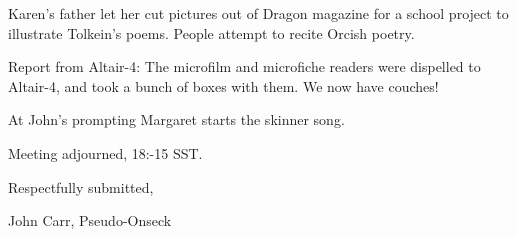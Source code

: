 \documentclass[10pt]{article}
\newcommand{\bing}{{\bf BING!} }
\newcommand{\goto}[1]{\bing \vskip 12pt \section*{{\em{#1}}}}
\begin{document}
Karen's father let her cut pictures out of Dragon magazine for
a school project to illustrate Tolkein's poems.  People attempt
to recite Orcish poetry.

Report from Altair-4: The microfilm and microfiche readers
were dispelled to Altair-4, and took a bunch of boxes with
them.  We now have couches!

At John's prompting Margaret starts the skinner song.


\vspace{12pt}

\noindent
Meeting adjourned, 18:-15 SST.

\vspace{18pt}

\centerline{Respectfully submitted,}
\centerline{John Carr, Pseudo-Onseck}
\end{document}
